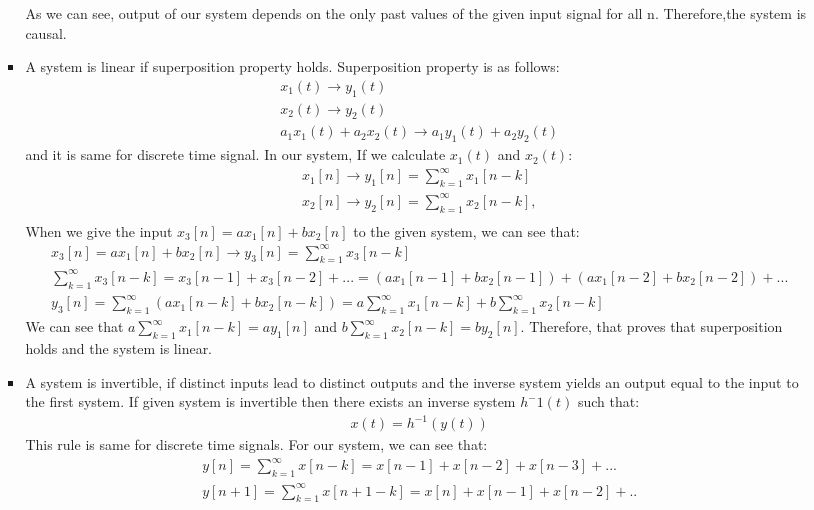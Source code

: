 \documentclass[10pt,a4paper, margin=1in]{article}
\begin{document}
\begin{enumerate}
\begin{enumerate}
\begin{itemize}
    As we can see, output of our system depends on the only past values of the given input signal for all n. Therefore,the system is causal. \\
    \item A system is linear if superposition property holds. Superposition property is as follows: 
    \begin{gather*}
        x_1(t) \rightarrow y_1(t) \\
        x_2(t) \rightarrow y_2(t) \\
        a_1x_1(t)+a_2x_2(t) \rightarrow a_1y_1(t)+a_2y_2(t)
    \end{gather*}
    and it is same for discrete time signal. In our system, If we calculate $x_1(t)$ and $x_2(t)$: 
    \begin{gather*}
       x_1[n]\rightarrow  y_1[n]=\sum_{k=1}^\infty x_1[n-k]  \\ 
       x_2[n]\rightarrow y_2[n]=\sum_{k=1}^\infty x_2[n-k], \\
    \end{gather*}
    When we give the input $x_3[n]=ax_1[n]+bx_2[n]$ to the given system, we can see that:
    \begin{gather*}
        x_3[n]=ax_1[n]+bx_2[n]\rightarrow y_3[n]=\sum_{k=1}^\infty x_3[n-k] \\ 
        \sum_{k=1}^\infty x_3[n-k] = x_3[n-1]+x_3[n-2]+... = (ax_1[n-1]+bx_2[n-1])+(ax_1[n-2]+bx_2[n-2])+... \\
        y_3[n] = \sum_{k=1}^\infty (ax_1[n-k]+bx_2[n-k]) = a\sum_{k=1}^\infty x_1[n-k]+ b\sum_{k=1}^\infty x_2[n-k]
    \end{gather*}
    We can see that $a\sum_{k=1}^\infty x_1[n-k] = ay_1[n]$ and $b\sum_{k=1}^\infty x_2[n-k] = by_2[n]$. Therefore, that proves that superposition holds and the system is linear. \\
    \item A system is invertible, if distinct inputs lead to distinct outputs and the inverse system yields an output equal to the input to the first system. If given system is invertible then there exists an inverse system $h^-1(t)$ such that:
    \begin{gather*}
        x(t) = h^{-1}(y(t))
    \end{gather*}
    This rule is same for discrete time signals. For our system, we can see that: 
    \begin{gather*}
        y[n] = \sum_{k=1}^\infty x[n-k]= x[n-1]+x[n-2]+x[n-3]+... \\
        y[n+1] = \sum_{k=1}^\infty x[n+1-k] = x[n]+x[n-1]+x[n-2]+..

\end{gather*}
\end{itemize}
\end{enumerate}
\end{enumerate}
\end{document}
